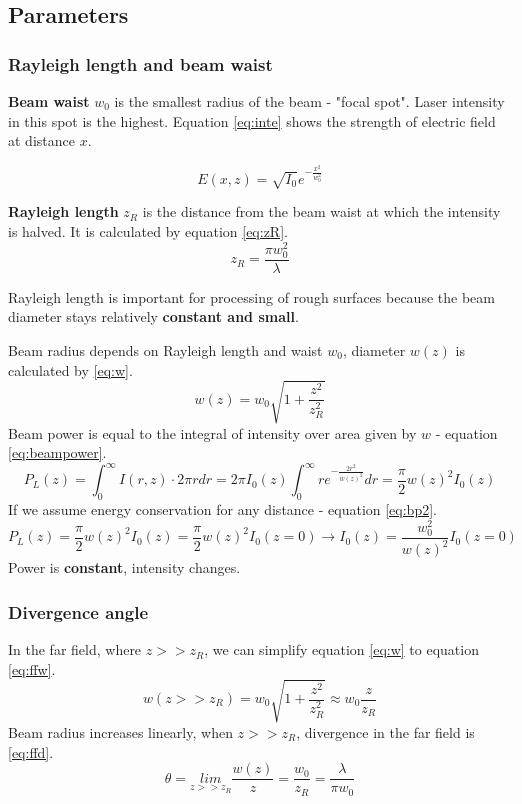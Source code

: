 \subsection{Parameters}

\subsubsection{Rayleigh length and beam waist}
\textbf{Beam waist} $w_0$ is the smallest radius of the beam - "focal spot". Laser intensity in this spot 
is the highest. Equation \ref{eq:inte} shows the strength of electric field at distance $x$.

\begin{equation}
    E(x,z) = \sqrt{I_0} e^{-\frac{x^2}{w_0^2}}
    \label{eq:inte}
\end{equation}


\textbf{Rayleigh length} $z_R$ is the distance from the beam waist at which the intensity is halved.
It is calculated by equation \ref{eq:zR}.
\begin{equation}
    z_R = \frac{\pi w_0^2}{\lambda}
    \label{eq:zR}
\end{equation}

Rayleigh length is important for processing of rough surfaces because the beam diameter stays relatively  \textbf{constant and small}.

Beam radius depends on Rayleigh length and waist $w_0$, diameter $w(z)$ is calculated by \ref{eq:w}.
\begin{equation}
    w(z) = w_0 \sqrt{1 + \frac{z^2}{z_R^2}}
    \label{eq:w}
\end{equation} 
Beam power is equal to the integral of intensity over area given by $w$ - equation \ref{eq:beampower}.
\begin{equation}
    P_L(z) = \int_{0}^{\infty} I(r,z) \cdot 2 \pi r dr = 2\pi I_0(z) \int_{0}^{\infty}r e^{-\frac{2r^2}{w(z)^2}} dr = \frac{\pi}{2} w(z)^2 I_0(z)
    \label{eq:beampower} 
\end{equation}
If we assume energy conservation for any distance - equation \ref{eq:bp2}.
\begin{equation}
    P_L(z) = \frac{\pi}{2} w(z)^2 I_0(z) = \frac{\pi}{2} w(z)^2 I_0(z=0) \rightarrow I_0(z)=\frac{w_0^2}{w(z)^2} I_0(z=0)
    \label{eq:bp2}
\end{equation}
Power is \textbf{constant}, intensity changes. 

\subsubsection{ Divergence angle}
In the far field, where $z >> z_R$, we can simplify equation \ref{eq:w} to equation \ref{eq:ffw}.
\begin{equation}
    w(z >> z_R) =w_0 \sqrt{1 + \frac{z^2}{z_R^2}} \approx w_0 \frac{z}{z_R}
    \label{eq:ffw}
\end{equation}
Beam radius increases linearly, when $z >> z_R$, divergence in the far field is \ref{eq:ffd}.
\begin{equation}
    \theta = \underset{z >> z_R}{lim} \frac{w(z)}{z} = \frac{w_0}{z_R} = \frac{\lambda}{\pi w_0}
    \label{eq:ffd}
\end{equation}


